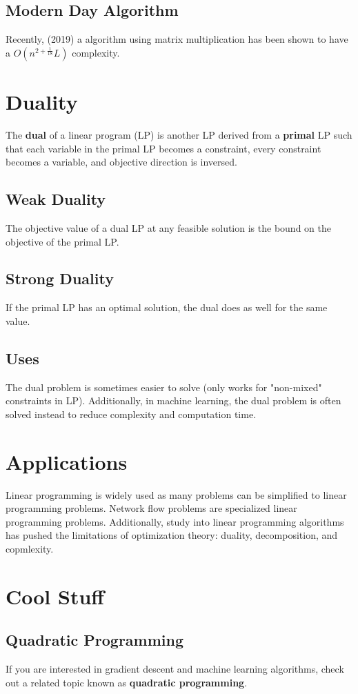 \documentclass{article}
\begin{document}
\subsection{Modern Day Algorithm}
Recently, (2019) a algorithm using matrix multiplication has been shown to have a $O(n^{2+\frac{1}{18}}L)$ complexity.

\section{Duality}
The \textbf{dual} of a linear program (LP) is another LP derived from a \textbf{primal} LP such that
each variable in the primal LP becomes a constraint, every constraint becomes a variable, and 
objective direction is inversed.
\subsection{Weak Duality}
The objective value of a dual LP at any feasible solution is the bound on the objective of the primal LP.
\subsection{Strong Duality}
If the primal LP has an optimal solution, the dual does as well for the same value.
\subsection{Uses}
The dual problem is sometimes easier to solve (only works for "non-mixed" constraints in LP). Additionally,
in machine learning, the dual problem is often solved instead to reduce complexity and computation time.

\section{Applications}
Linear programming is widely used as many problems can be simplified to linear programming problems. Network flow problems 
are specialized linear programming problems. Additionally, study into linear programming algorithms has pushed the limitations of
optimization theory: duality, decomposition, and copmlexity.

\section{Cool Stuff}
\subsection{Quadratic Programming}
If you are interested in gradient descent and machine learning algorithms, check out a related topic known as \textbf{quadratic programming}.
\end{document}
